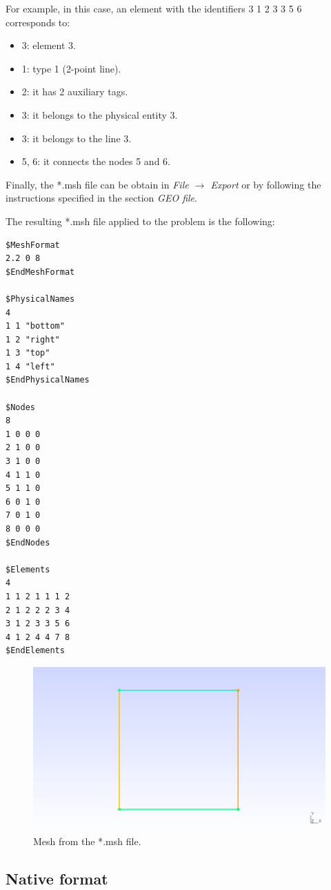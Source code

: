 \documentclass[A4]{article}
\begin{document}
For example, in this case, an element with the identifiers 3 1 2 3 3 5 6 corresponds to:

\begin{itemize}
	\item 3: element 3.
	\item 1: type 1 (2-point line).
	\item 2: it has 2 auxiliary tags.
	\item 3: it belongs to the physical entity 3.
	\item 3: it belongs to the line 3.
	\item 5, 6: it connects the nodes 5 and 6.
\end{itemize} 

Finally, the *.msh file can be obtain in \textit{File $\to$ Export} or by following the instructions specified in the section \textit{GEO file}.

The resulting *.msh file applied to the problem is the following:

\begin{Verbatim}
$MeshFormat
2.2 0 8
$EndMeshFormat

$PhysicalNames
4
1 1 "bottom"
1 2 "right"
1 3 "top"
1 4 "left"
$EndPhysicalNames

$Nodes
8
1 0 0 0
2 1 0 0
3 1 0 0
4 1 1 0
5 1 1 0
6 0 1 0
7 0 1 0
8 0 0 0
$EndNodes

$Elements
4
1 1 2 1 1 1 2
2 1 2 2 2 3 4
3 1 2 3 3 5 6
4 1 2 4 4 7 8
$EndElements
\end{Verbatim}

\begin{figure}[h]
	\centering
	\includegraphics[scale = 0.5]{mesh.png}
	\caption{Mesh from the *.msh file.}
	\label{fig:mesh}
\end{figure}

\subsection{Native format}
\end{document}
